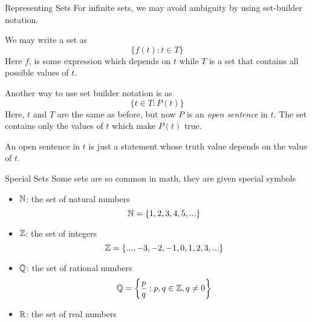 \documentclass{beamer}
\begin{document}
		\begin{frame}{Representing Sets}
				\footnotesize
				For infinite sets, we may avoid ambiguity by using \alert{set-builder notation}. 
				\begin{definition}
						We may write a set as 
						\begin{equation*}
								\{f(t) : t\in T\}
						\end{equation*}
						Here $f$, is some expression which depends on $t$ while $T$ is a set that contains all possible values of $t$. 
				\end{definition}
				\begin{definition}
						Another way to use set builder notation is as 
						\begin{equation*}
								\{t\in T : P(t)\}
						\end{equation*}
						Here, $t$ and $T$ are the same as before, but now $P$ is an \emph{open sentence} in $t$. The set contains only the values of $t$ which make $P(t)$ true. 
				\end{definition}
				An \alert{open sentence} in $t$ is just a statement whose truth value depends on the value of $t$. 
		\end{frame}

		\begin{frame}{Special Sets}
				Some sets are so common in math, they are given special symbols 
				\begin{itemize}
						\item $\mathbb{N}$: the set of \alert{natural numbers}
								\begin{equation*}
										\mathbb{N} = \{1, 2, 3, 4, 5, ...\}
								\end{equation*}
						\item $\mathbb{Z}$: the set of \alert{integers}
								\begin{equation*}
										\mathbb{Z} = \{..., -3, -2, -1, 0, 1, 2, 3, ...\}
								\end{equation*}
						\item $\mathbb{Q}$: the set of \alert{rational numbers}
								\begin{equation*}
										\mathbb{Q} = \left\{ \frac{p}{q} : p, q\in \mathbb{Z}, q \neq 0\right\}
								\end{equation*}
						\item $\mathbb{R}$: the set of \alert{real numbers}
				\end{itemize}
		\end{frame}
\end{document}
